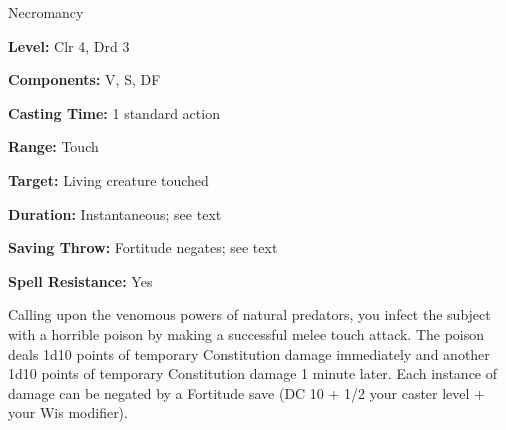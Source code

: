 
Necromancy

\textbf{Level:} Clr 4, Drd 3

\textbf{Components:} V, S, DF

\textbf{Casting Time:} 1 standard action

\textbf{Range:} Touch

\textbf{Target:} Living creature touched

\textbf{Duration:} Instantaneous; see text

\textbf{Saving Throw:} Fortitude negates; see text

\textbf{Spell Resistance:} Yes

Calling upon the venomous powers of natural predators, you infect the subject with 
a horrible poison by making a successful melee touch attack. The poison deals 1d10 
points of temporary Constitution damage immediately and another 1d10 points of 
temporary Constitution damage 1 minute later. Each instance of damage can be negated 
by a Fortitude save (DC 10 + 1/2 your caster level + your Wis modifier).

